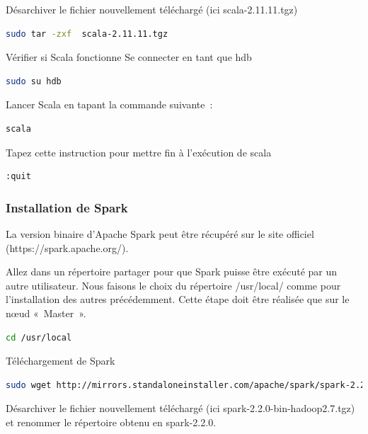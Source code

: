 \documentclass[12pt,french]{book}
\begin{document}
Désarchiver le fichier nouvellement téléchargé (ici scala-2.11.11.tgz)

\begin{lstlisting}[language=bash, frame=single]
sudo tar -zxf  scala-2.11.11.tgz
\end{lstlisting}

Vérifier si Scala fonctionne
Se connecter en tant que hdb

\begin{lstlisting}[language=bash, frame=single]
sudo su hdb
\end{lstlisting}

Lancer Scala en tapant la commande suivante :

\begin{lstlisting}[language=bash, frame=single]
scala
\end{lstlisting}

Tapez cette instruction pour mettre fin à l'exécution de scala

\begin{lstlisting}[language=bash, frame=single]
:quit
\end{lstlisting}

\subsubsection{Installation de Spark}

La version binaire d’Apache Spark peut être récupéré sur le site officiel (https://spark.apache.org/).

Allez dans un répertoire partager pour que Spark puisse être exécuté par un autre utilisateur.
Nous faisons le choix du répertoire /usr/local/ comme pour l’installation des autres précédemment.
Cette étape doit être réalisée que sur le nœud « Master ».

\begin{lstlisting}[language=bash, frame=single]
cd /usr/local
\end{lstlisting}

Téléchargement de Spark

\begin{lstlisting}[language=bash, frame=single, breaklines=true, postbreak=\mbox{\textcolor{red}{$\hookrightarrow$}\space}]
sudo wget http://mirrors.standaloneinstaller.com/apache/spark/spark-2.2.0/spark-2.2.0-bin-hadoop2.7.tgz
\end{lstlisting}

Désarchiver le fichier nouvellement téléchargé (ici spark-2.2.0-bin-hadoop2.7.tgz) et renommer le répertoire obtenu en spark-2.2.0.
\end{document}
